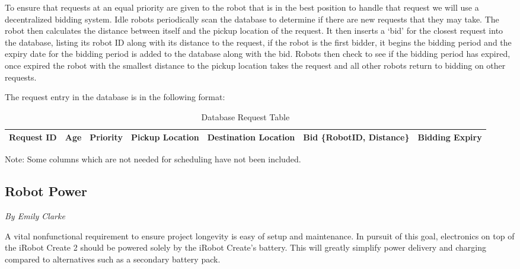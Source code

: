 \documentclass[12pt]{report}
\newcommand{\sectionAuthor}[1]{{\small\vspace{-1em}\textit{#1}}\bigskip\par}
\begin{document}
To ensure that requests at an equal priority are given to the robot that is in the best position to handle that request we will use a decentralized bidding system. Idle robots periodically scan the database to determine if there are new requests that they may take. The robot then calculates the distance between itself and the pickup location of the request. It then inserts a `bid' for the closest request into the database, listing its robot ID along with its distance to the request, if the robot is the first bidder, it begins the bidding period and the expiry date for the bidding period is added to the database along with the bid. Robots then check to see if the bidding period has expired, once expired the robot with the smallest distance to the pickup location takes the request and all other robots return to bidding on other requests.

The request entry in the database is in the following format:
\begin{table}[H]
\centering
\caption{Database Request Table}
\centering
\begin{tabular} { | p{1.5cm} | p{1.5cm} | p{1.5cm} | p{2cm} | p{2cm} | p{3cm} | p{1.5cm} | }
\hline
Request ID & Age & Priority & Pickup Location & Destination Location & Bid \{RobotID, Distance\} & Bidding Expiry\\
\hline

\end{tabular}
\begin{tablenotes}
      \small
      \centering
      \item Note: Some columns which are not needed for scheduling have not been included.
\end{tablenotes}
\end{table}%


\clearpage
\subsection{Robot Power}
\label{RobotPower}
\sectionAuthor{By Emily Clarke}
A vital nonfunctional requirement to ensure project longevity is easy of setup and maintenance. In pursuit of this goal, electronics on top of the iRobot Create 2 should be powered solely by the iRobot Create's battery. This will greatly simplify power delivery and charging compared to alternatives such as a secondary battery pack.
\end{document}

